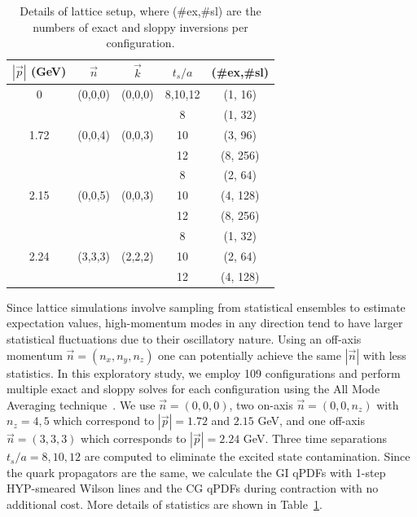 \documentclass[prd,twocolumn,preprintnumbers,showpacs,nofootinbib,superscriptaddress,notitlepage,floatfix]{revtex4-1}
\DeclareRobustCommand{\tbl}[1]{Table~\ref{tbl:#1}}
\begin{document}
\begin{table}
\centering
\begin{tabular}{c|c|c|c|c}
\hline
\hline
$|\vec{p}|$ (GeV)&$\vec{n}$ & $\vec{k}$ & $t_s/a$ & (\#ex,\#sl) \\
\hline
 0   &(0,0,0) & (0,0,0) & 8,10,12 & (1, 16) \\
\hline
     && & 8       & (1, 32) \\
 1.72&(0,0,4) & (0,0,3) & 10      & (3, 96) \\
     && & 12      & (8, 256) \\
\hline
     && & 8       & (2, 64) \\
 2.15&(0,0,5) & (0,0,3) & 10      & (4, 128) \\
     && & 12      & (8, 256) \\
 \hline
     & &  & 8       & (1, 32) \\
 2.24&(3,3,3) & (2,2,2) & 10      & (2, 64) \\
     && & 12      & (4, 128) \\
\hline
\hline
\end{tabular}
\caption{Details of lattice setup, where (\#ex,\#sl) are the numbers of exact and sloppy inversions per configuration.}
\label{tbl:setup}
\end{table}

Since lattice simulations involve sampling from statistical ensembles to estimate expectation values, high-momentum modes in any direction tend to have larger statistical fluctuations due to their oscillatory nature. Using an off-axis momentum $\vec{n}=(n_x,n_y,n_z)$ one can potentially achieve the same $|\vec{n}|$ with less statistics. In this exploratory study, we employ 109 configurations and perform multiple exact and sloppy solves for each configuration using the All Mode Averaging technique~\cite{Shintani:2014vja}. We use $\vec{n}=(0,0,0)$, two on-axis $\vec{n}=(0,0,n_z)$ with $n_z=4,5$ which correspond to $|\vec{p}|=1.72$ and $2.15$ GeV, and one off-axis $\vec{n}=(3,3,3)$ which corresponds to $|\vec{p}|=2.24$ GeV. Three time separations $t_s/a=8,10,12$ are computed to eliminate the excited state contamination. Since the quark propagators are the same, we calculate the GI qPDFs with 1-step HYP-smeared Wilson lines and the CG qPDFs during contraction with no additional cost. More details of statistics are shown in \tbl{setup}.
\end{document}
